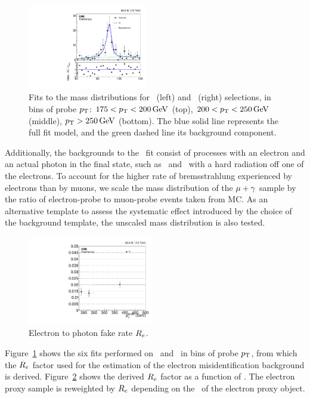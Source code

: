 \begin{figure}[htbp]
\begin{center}
    \includegraphics[width=0.47\textwidth]{Analysis/Figures/fit_data_eg_pt_250_6500.pdf}
    \caption{
      Fits to the mass distributions for \Pe\Pe\ (left) and \Pe\Pgg\ (right) selections, in bins of probe $p_{\mathrm{T}}$: $175 < p_{\mathrm{T}} < 200\,\text{Ge\hspace{-.08em}V}$ (top), $200 < p_{\mathrm{T}} < 250\,\text{Ge\hspace{-.08em}V}$ (middle), $p_{\mathrm{T}} > 250\,\text{Ge\hspace{-.08em}V}$ (bottom). 
      The blue solid line represents the full fit model, and the green dashed line its background component.
    }
    \label{fig:efake_fits}
  \end{center}
\end{figure}

Additionally, the backgrounds to the \Pe\Pgg\ fit consist of processes with an electron and an actual photon in the final state, such as \PW\Pgg\ and \Zee\ with a hard radiation off one of the electrons.
To account for the higher rate of bremsstrahlung experienced by electrons than by muons, we scale the mass distribution of the ${\mu}+\gamma$ sample by the ratio of electron-probe to muon-probe events taken from MC.
As an alternative template to assess the systematic effect introduced by the choice of the background template, the unscaled mass distribution is also tested.

\begin{figure}[htbp]
  \begin{center}
    \includegraphics[width=0.49\textwidth]{Analysis/Figures/frate_data_ptalt.pdf} 
    \caption{
      Electron to photon fake rate $R_{{e}}$.
    }
    \label{fig:efake_frate}
  \end{center}
\end{figure}


Figure~\ref{fig:efake_fits} shows the six fits performed on \Pe\Pe\ and \Pe\Pgg\ in bins of probe $p_{\mathrm{T}}$, from which the $R_{{e}}$ factor used for the estimation of the electron misidentification background is derived.
Figure~\ref{fig:efake_frate} shows the derived $R_{{e}}$ factor as a function of \ETg. 
The electron proxy sample is reweighted by $R_{{e}}$ depending on the \pt\ of the electron proxy object.

